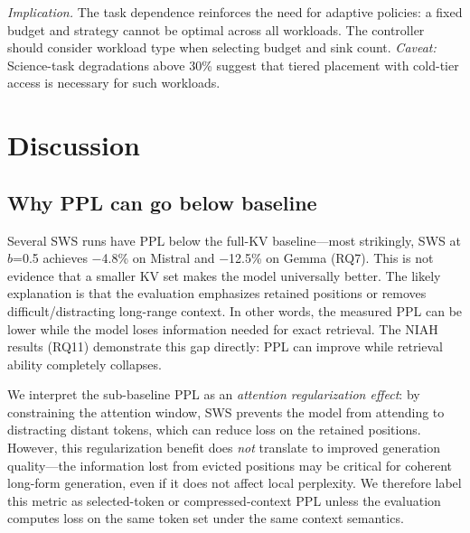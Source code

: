 \documentclass[11pt]{article}
\newcommand{\sws}{SWS}
\newcommand{\pct}{\%}
\theoremstyle{definition}
\theoremstyle{plain}
\begin{document}
\emph{Implication.}  The task dependence reinforces the need for adaptive policies: a fixed budget and strategy cannot be optimal across all workloads.  The controller should consider workload type when selecting budget and sink count.  \emph{Caveat:} Science-task degradations above 30\pct{} suggest that tiered placement with cold-tier access is necessary for such workloads.

\section{Discussion}
\label{sec:discussion}

\subsection{Why PPL can go below baseline}
Several \sws{} runs have PPL below the full-KV baseline---most strikingly, \sws{} at $b$=0.5 achieves $-$4.8\pct{} on Mistral and $-$12.5\pct{} on Gemma (RQ7).  This is not evidence that a smaller KV set makes the model universally better.  The likely explanation is that the evaluation emphasizes retained positions or removes difficult/distracting long-range context.  In other words, the measured PPL can be lower while the model loses information needed for exact retrieval.  The NIAH results (RQ11) demonstrate this gap directly: PPL can improve while retrieval ability completely collapses.

We interpret the sub-baseline PPL as an \emph{attention regularization effect}: by constraining the attention window, \sws{} prevents the model from attending to distracting distant tokens, which can reduce loss on the retained positions.  However, this regularization benefit does \emph{not} translate to improved generation quality---the information lost from evicted positions may be critical for coherent long-form generation, even if it does not affect local perplexity.  We therefore label this metric as selected-token or compressed-context PPL unless the evaluation computes loss on the same token set under the same context semantics.
\end{document}
